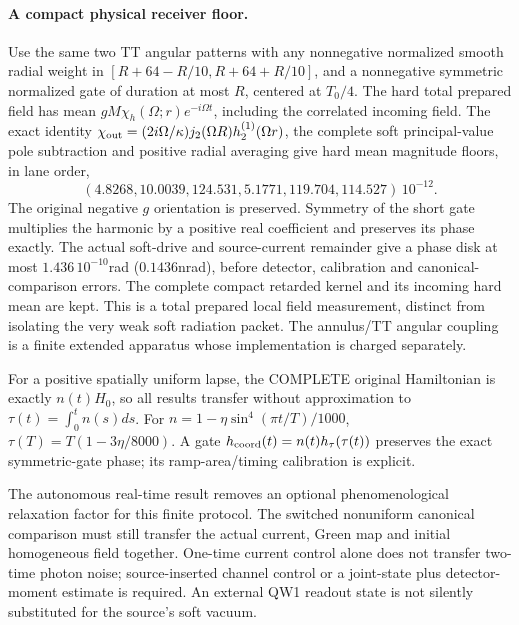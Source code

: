 \paragraph{A compact physical receiver floor.}
Use the same two TT angular patterns with any nonnegative normalized smooth
radial weight in \([R+64-R/10,R+64+R/10]\), and a nonnegative symmetric
normalized gate of duration at most \(R\), centered at \(T_0/4\).
The hard total prepared field has mean
\(gM\chi_h(\Omega;r)e^{-i\Omega t}\), including the correlated incoming
field. The exact identity
\(\chi_{\rm out}=(2i\Omega/\kappa)j_2(\Omega R)h_2^{(1)}(\Omega r)\),
the complete soft principal-value pole subtraction and positive radial
averaging give hard mean magnitude floors, in lane order,
\begin{equation}
 (4.8268,10.0039,124.531,5.1771,119.704,114.527)\,10^{-12}.
\end{equation}
The original negative \(g\) orientation is preserved. Symmetry of the
short gate multiplies the harmonic by a positive real coefficient and
preserves its phase exactly. The actual soft-drive and source-current
remainder give a phase disk at most \(1.436\,10^{-10}\)rad
(\(0.1436\)nrad), before detector, calibration and canonical-comparison
errors. The complete compact retarded kernel and its incoming hard mean
are kept. This is a total prepared local field measurement, distinct from
isolating the very weak soft radiation packet. The annulus/TT angular
coupling is a finite extended apparatus whose implementation is charged
separately.

For a positive spatially uniform lapse, the COMPLETE original Hamiltonian
is exactly \(n(t)H_0\), so all results transfer without approximation to
\(\tau(t)=\int_0^t n(s)ds\). For
\(n=1-\eta\sin^4(\pi t/T)/1000\),
\(\tau(T)=T(1-3\eta/8000)\). A gate
\(h_{\rm coord}(t)=n(t)h_\tau(\tau(t))\) preserves the exact symmetric-gate
phase; its ramp-area/timing calibration is explicit.

The autonomous real-time result removes an optional phenomenological
relaxation factor for this finite protocol. The switched nonuniform
canonical comparison must still transfer the actual current, Green map and
initial homogeneous field together. One-time current control alone does
not transfer two-time photon noise; source-inserted channel control or a
joint-state plus detector-moment estimate is required. An external QW1
readout state is not silently substituted for the source's soft vacuum.

